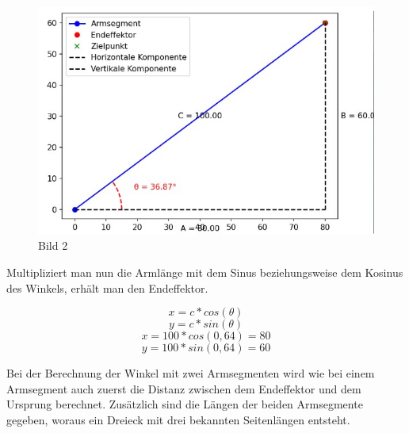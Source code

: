 \documentclass[12pt]{article}
\begin{document}
                    \begin{figure}[h]
                        \centering
                        \includegraphics[width = \linewidth]{Bild 2}
                        \caption{Bild 2}
                    \end{figure}

                    Multipliziert man nun die Armlänge mit dem Sinus beziehungsweise dem Kosinus des Winkels, erhält
                    man den Endeffektor.

                    \[
                        x=c * cos(\theta)
                    \]
                    \[
                        y=c * sin(\theta)
                    \]
                    \[
                        x=100 * cos(0,64)=80
                    \]
                    \[
                        y=100 * sin(0,64)=60
                    \]


                    Bei der Berechnung der Winkel mit zwei Armsegmenten wird wie bei einem Armsegment auch zuerst
                    die Distanz zwischen dem Endeffektor und dem Ursprung berechnet. Zusätzlich sind die Längen der
                    beiden Armsegmente gegeben, woraus ein Dreieck mit drei bekannten Seitenlängen entsteht.
\end{document}
